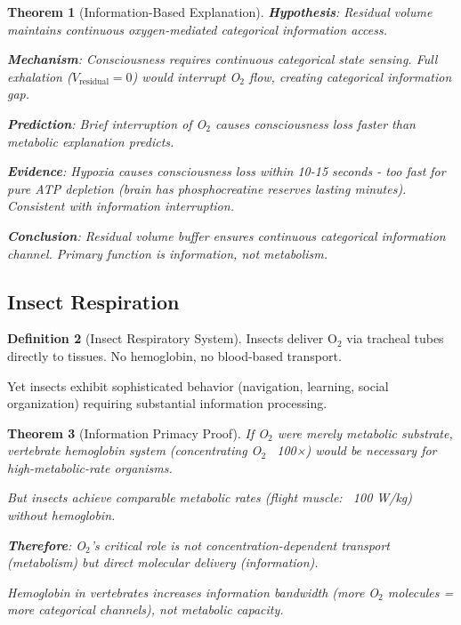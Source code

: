 \documentclass[11pt,a4paper]{article}
\newtheorem{theorem}{Theorem}[section]
\theoremstyle{definition}
\newtheorem{definition}[theorem]{Definition}
\theoremstyle{remark}
\begin{document}
\begin{theorem}[Information-Based Explanation]
\textbf{Hypothesis}: Residual volume maintains continuous oxygen-mediated categorical information access.

\textbf{Mechanism}: Consciousness requires continuous categorical state sensing. Full exhalation ($V_{\text{residual}} = 0$) would interrupt O$_2$ flow, creating categorical information gap.

\textbf{Prediction}: Brief interruption of O$_2$ causes consciousness loss faster than metabolic explanation predicts.

\textbf{Evidence}: Hypoxia causes consciousness loss within 10-15 seconds \cite{Rice2019} - too fast for pure ATP depletion (brain has phosphocreatine reserves lasting minutes). Consistent with information interruption.

\textbf{Conclusion}: Residual volume buffer ensures continuous categorical information channel. Primary function is \textit{information}, not metabolism.
\end{theorem}

\subsection{Insect Respiration}

\begin{definition}[Insect Respiratory System]
Insects deliver O$_2$ via tracheal tubes directly to tissues. No hemoglobin, no blood-based transport.

Yet insects exhibit sophisticated behavior (navigation, learning, social organization) requiring substantial information processing.
\end{definition}

\begin{theorem}[Information Primacy Proof]
If O$_2$ were merely metabolic substrate, vertebrate hemoglobin system (concentrating O$_2$ ~100×) would be necessary for high-metabolic-rate organisms.

But insects achieve comparable metabolic rates (flight muscle: ~100 W/kg) without hemoglobin.

\textbf{Therefore}: O$_2$'s critical role is not concentration-dependent transport (metabolism) but direct molecular delivery (information).

Hemoglobin in vertebrates increases \textit{information bandwidth} (more O$_2$ molecules = more categorical channels), not metabolic capacity.
\end{theorem}
\end{document}
